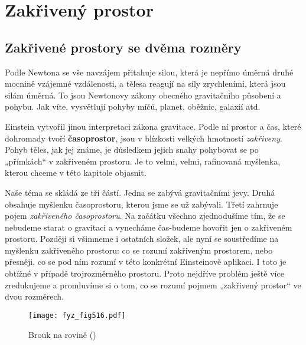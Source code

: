 \setchaptertoc
\chapter{Zakřivený prostor}\label{fyz:IIchapXLII}
  \section{Zakřivené prostory se dvěma rozměry}\label{fyz:IIchapXLIIsecI}
    Podle Newtona se vše navzájem přitahuje silou, která je nepřímo úměrná druhé mocnině vzájemné 
    vzdálenosti, a tělesa reagují na síly zrychleními, která jsou silám úměrná. To jsou Newtonovy 
    zákony obecného gravitačního působení a pohybu. Jak víte, vysvětlují pohyby míčů, planet, 
    oběžnic, galaxií atd.
    
    Einstein vytvořil jinou interpretaci zákona gravitace. Podle ní prostor a čas, které dohromady 
    tvoří \textbf{časoprostor}, jsou v blízkosti velkých hmotností \emph{zakřiveny}. Pohyb těles, 
    jak jej známe, je důsledkem jejich snahy pohybovat se po „přímkách“ v zakřiveném prostoru. Je 
    to velmi, velmi, rafinovaná myšlenka, kterou chceme v této kapitole objasnit.
    
    Naše téma se skládá ze tří částí. Jedna se zabývá gravitačními jevy. Druhá obsahuje myšlenku 
    časoprostoru, kterou jsme se už zabývali. Třetí zahrnuje pojem \emph{zakřiveného časoprostoru}. 
    Na začátku všechno zjednodušíme tím, že se nebudeme starat o gravitaci a vynecháme čas-budeme 
    hovořit jen o zakřiveném prostoru. Později si všimneme i ostatních složek, ale nyní se 
    soustředíme na myšlenku zakřiveného prostoru: co se rozumí zakřiveným prostorem, nebo přesněji, 
    co se pod ním rozumí v této konkrétní Einsteinově aplikaci. I toto je obtížné v případě 
    trojrozměrného prostoru. Proto nejdříve problém ještě více zredukujeme a promluvíme si o tom, 
    co se rozumí pojmem „zakřivený prostor“ ve dvou rozměrech.

    \begin{figure}[ht!] %
      \centering
      \texttt{[image: fyz\_fig516.pdf]}
      \caption{Brouk na rovině (\cite[s.~775]{Feynman02})}
      \label{fyz:fig516}
    \end{figure}
    
